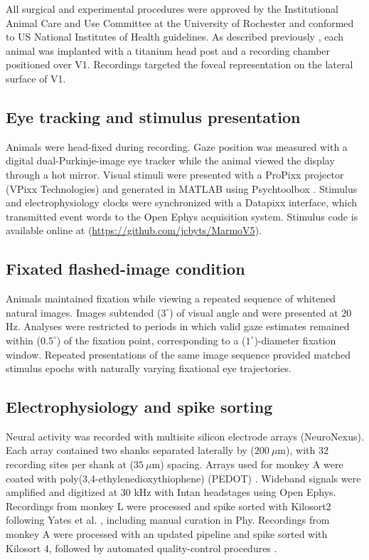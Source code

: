 \documentclass{lite}
\begin{document}
All surgical and experimental procedures were approved by the Institutional Animal Care and Use Committee at the University of Rochester and conformed to US National Institutes of Health guidelines. As described previously \cite{yates2023detailed}, each animal was implanted with a titanium head post and a recording chamber positioned over V1. Recordings targeted the foveal representation on the lateral surface of V1.

\subsection{Eye tracking and stimulus presentation}

Animals were head-fixed during recording. Gaze position was measured with a digital dual-Purkinje-image eye tracker \cite{yates2023detailed, wu2023high, ressmeyer2025openirisdpi} while the animal viewed the display through a hot mirror. Visual stimuli were presented with a ProPixx projector (VPixx Technologies) and generated in MATLAB using Psychtoolbox \cite{kleiner2007s}. Stimulus and electrophysiology clocks were synchronized with a Datapixx interface, which transmitted event words to the Open Ephys acquisition system. Stimulus code is available online at (\url{https://github.com/jcbyts/MarmoV5}).

\subsection{Fixated flashed-image condition}

Animals maintained fixation while viewing a repeated sequence of whitened natural images. Images subtended ($\text{3}^\circ$) of visual angle and were presented at 20 Hz. Analyses were restricted to periods in which valid gaze estimates remained within ($\text{0.5}^\circ$) of the fixation point, corresponding to a ($\text{1}^\circ$)-diameter fixation window. Repeated presentations of the same image sequence provided matched stimulus epochs with naturally varying fixational eye trajectories.

\subsection{Electrophysiology and spike sorting}

Neural activity was recorded with multisite silicon electrode arrays (NeuroNexus). Each array contained two shanks separated laterally by ($\text{200}~\mu\mathrm{m}$), with 32 recording sites per shank at ($\text{35}~\mu\mathrm{m}$) spacing. Arrays used for monkey A were coated with poly(3,4-ethylenedioxythiophene) (PEDOT) \cite{cui2003electrochemical}. Wideband signals were amplified and digitized at 30 kHz with Intan headstages using Open Ephys. Recordings from monkey L were processed and spike sorted with Kilosort2 following Yates et al. \cite{yates2023detailed}, including manual curation in Phy. Recordings from monkey A were processed with an updated pipeline and spike sorted with Kilosort 4, followed by automated quality-control procedures \cite{roth2026flexible}.
\end{document}
